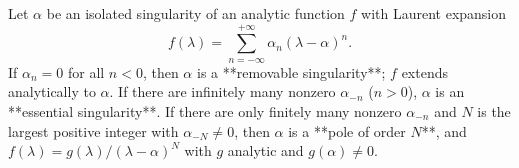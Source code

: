 Let $\alpha$ be an isolated singularity of an analytic function $f$ with Laurent expansion
$$f(\lambda) = \sum_{n=-\infty}^{+\infty} \alpha_n (\lambda - \alpha)^n.$$
If $\alpha_n = 0$ for all $n < 0$, then $\alpha$ is a **removable singularity**; $f$ extends analytically to $\alpha$. If there are infinitely many nonzero $\alpha_{-n}$ ($n > 0$), $\alpha$ is an **essential singularity**. If there are only finitely many nonzero $\alpha_{-n}$ and $N$ is the largest positive integer with $\alpha_{-N} \neq 0$, then $\alpha$ is a **pole of order $N$**, and $f(\lambda) = g(\lambda)/(\lambda - \alpha)^N$ with $g$ analytic and $g(\alpha) \neq 0$.
